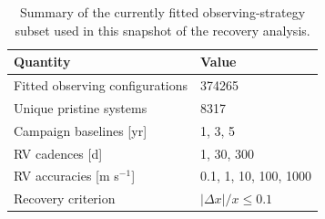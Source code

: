 \begin{table}
\centering
\small
\caption{Summary of the currently fitted observing-strategy subset used in this snapshot of the recovery analysis.}
\label{tab:recovery-sample-summary}
\begin{tabular}{ll}
\hline
Quantity & Value \\
\hline
Fitted observing configurations & 374265 \\
Unique pristine systems & 8317 \\
Campaign baselines [yr] & 1, 3, 5 \\
RV cadences [d] & 1, 30, 300 \\
RV accuracies [m s$^{-1}$] & 0.1, 1, 10, 100, 1000 \\
Recovery criterion & $|\Delta x|/x \leq 0.1$ \\
\hline
\end{tabular}
\end{table}
